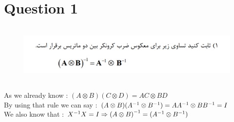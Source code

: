 \documentclass[a4paper,12pt]{article}
\begin{document}

\section {Question 1}

\begin{figure}[h!]
	\centering
	\includegraphics*[height=3cm]{Q1}
\end{figure}


\begin{doublespace}
As we already know :
$ (A \otimes B ) ( C \otimes D ) = AC \otimes BD $ \\
By using that rule we can say :
$ ( A \otimes B )({A}^{-1} \otimes {B}^{-1} ) = A{A}^{-1} \otimes B{B}^{-1} = I  $ \\
We also know that : $ {X}^{-1}  X  = I \Rightarrow {( A \otimes B )}^{-1} = ({A}^{-1} \otimes {B}^{-1} ) $
\end{doublespace}
\end{document}
